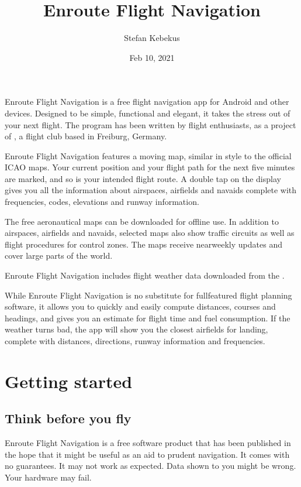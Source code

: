 \documentclass[letterpaper,10pt,english]{sphinxmanual}
\title{Enroute Flight Navigation}
\date{Feb 10, 2021}
\author{Stefan Kebekus}
\let\sphinxpxdimen\pdfpxdimen\else\newdimen\sphinxpxdimen
\begin{document}
\pagestyle{empty}
\sphinxmaketitle
\pagestyle{plain}
\sphinxtableofcontents
\pagestyle{normal}
\label{\detokenize{index::doc}}


\noindent{\hspace*{\fill}\sphinxincludegraphics[width=100\sphinxpxdimen]{{de.akaflieg_freiburg.enroute}.png}\hspace*{\fill}}

Enroute Flight Navigation is a free flight navigation app for Android and other
devices. Designed to be simple, functional and elegant, it takes the stress out
of your next flight. The program has been written by flight enthusiasts, as a
project of , a flight club
based in Freiburg, Germany.

Enroute Flight Navigation features a moving map, similar in style to the
official ICAO maps. Your current position and your flight path for the next five
minutes are marked, and so is your intended flight route. A double tap on the
display gives you all the information about airspaces, airfields and navaids \textendash{}
complete with frequencies, codes, elevations and runway information.

The free aeronautical maps can be downloaded for offline use. In addition to
airspaces, airfields and navaids, selected maps also show traffic circuits as
well as flight procedures for control zones. The maps receive near\sphinxhyphen{}weekly
updates and cover large parts of the world.

Enroute Flight Navigation includes flight weather data downloaded from the
.

While Enroute Flight Navigation is no substitute for full\sphinxhyphen{}featured flight
planning software, it allows you to quickly and easily compute distances,
courses and headings, and gives you an estimate for flight time and fuel
consumption. If the weather turns bad, the app will show you the closest
airfields for landing, complete with distances, directions, runway information
and frequencies.

\part{Getting started}


\chapter{Think before you fly}
\label{\detokenize{01-intro/think:think-before-you-fly}}\label{\detokenize{01-intro/think::doc}}
Enroute Flight Navigation is a free software product that has been published in
the hope that it might be useful as an aid to prudent navigation.  It comes with
no guarantees.  It may not work as expected.  Data shown to you might be wrong.
Your hardware may fail.
\end{document}
